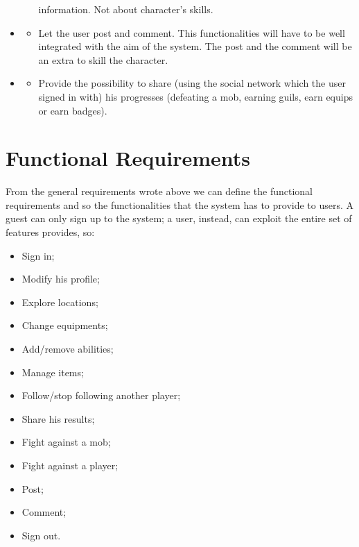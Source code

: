 \begin{itemize}
\begin{itemize}
				information. Not about character's skills.
			\end{itemize}
		\item \textbf{\goalSocial}
			\begin{itemize}
				\item Let the user post and comment. This functionalities will have to be well integrated with the aim of the system. The post and the comment will be an extra to skill the character.
			\end{itemize}
		\item \textbf{\goalShare}
			\begin{itemize}
				\item Provide the possibility to share (using the social network which the user signed in with) his 
				progresses (defeating a mob, earning guils, earn equips or earn badges).
			\end{itemize}
	\end{itemize}

	\section{Functional Requirements}
		From the general requirements wrote above we can define the functional requirements 
		and so the functionalities that the system has to provide to users. A guest can only sign up to the system; 
		a user, instead, can exploit the entire set of features provides, so:
		\begin{itemize}
			\item Sign in;
			\item Modify his profile;
			\item Explore locations;
			\item Change equipments;
			\item Add/remove abilities;
			\item Manage items;
			\item Follow/stop following another player;
			\item Share his results;
			\item Fight against a mob;
			\item Fight against a player;
			\item Post;
			\item Comment;
			\item Sign out.
		\end{itemize}
